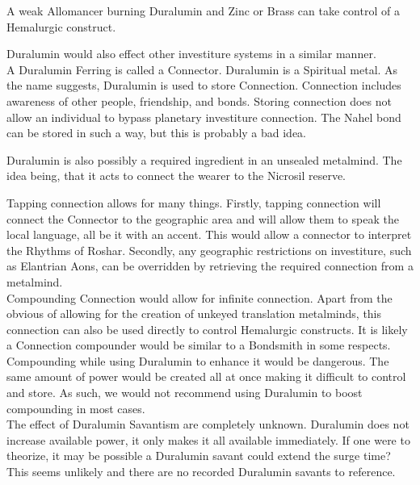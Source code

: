 \documentclass[conference]{IEEEtran}
\begin{document}
A weak Allomancer burning Duralumin and Zinc or Brass can take control of a Hemalurgic construct.\cite{WoA-CH40}\cite{WoA-CH54}

Duralumin would also effect other investiture systems in a similar manner.\cite{dl-universal}\\

A Duralumin Ferring is called a Connector.\cite{ARS}  Duralumin is a Spiritual metal.\cite{FE-TB}  As the name suggests, Duralumin is used to store Connection.  Connection includes awareness of other people, friendship, and bonds.\cite{ARS}  Storing connection does not allow an individual to bypass planetary investiture connection.\cite{con-travel}
The Nahel bond can be stored in such a way, but this is probably a bad idea.\cite{con-nahel}

Duralumin is also possibly a required ingredient in an unsealed metalmind.  The idea being, that it acts to connect the wearer to the Nicrosil reserve.

Tapping connection allows for many things.  Firstly, tapping connection will connect the Connector to the geographic area and will allow them to speak the local language,\cite{BoM-CH22} all be it with an accent.  This would allow a connector to interpret the Rhythms of Roshar.\cite{con-rhy}  Secondly, any geographic restrictions on investiture, such as Elantrian Aons, can be overridden by retrieving the required connection from a metalmind.\cite{con-lock}  \\

Compounding Connection would allow for infinite connection.  Apart from the obvious of allowing for the creation of unkeyed translation metalminds,\cite{BoM-CH22} this connection can also be used directly to control Hemalurgic constructs.\cite{con-con}
It is likely a Connection compounder would be similar to a Bondsmith in some respects.\cite{RoW-CH111}\\

Compounding while using Duralumin to enhance it would be dangerous.  The same amount of power would be created all at once making it difficult to control and store.  As such, we would not recommend using Duralumin to boost compounding in most cases.\cite{dl-comp}\\

The effect of Duralumin Savantism are completely unknown.  Duralumin does not increase available power, it only makes it all available immediately.  If one were to theorize, it may be possible a Duralumin savant could extend the surge time?  This seems unlikely and there are no recorded Duralumin savants to reference.\\
\end{document}
